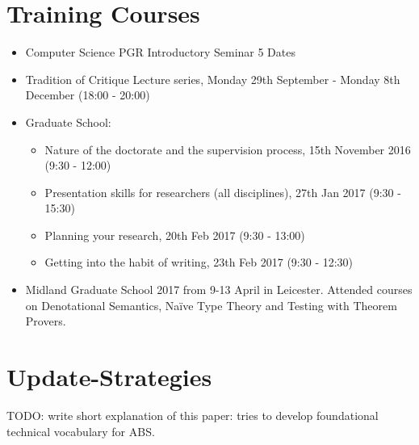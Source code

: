 \begin{appendices}

\chapter{Training Courses}
\begin{itemize}
\item Computer Science PGR Introductory Seminar 5 Dates
\item Tradition of Critique Lecture series, Monday 29th September - Monday 8th December (18:00 - 20:00)
\item Graduate School: 
	\begin{itemize}	
		\item Nature of the doctorate and the supervision process, 15th November 2016 (9:30 - 12:00)
		\item Presentation skills for researchers (all disciplines), 27th Jan 2017 (9:30 - 15:30)
		\item Planning your research, 20th Feb 2017 (9:30 - 13:00)
		\item Getting into the habit of writing, 23th Feb 2017 (9:30 - 12:30)
	\end{itemize}
\item Midland Graduate School 2017 from 9-13 April in Leicester. Attended courses on Denotational Semantics, Naïve Type Theory and Testing with Theorem Provers.
\end{itemize}

\chapter{Update-Strategies}
TODO: write short explanation of this paper: tries to develop foundational technical vocabulary for ABS.


\end{appendices}
